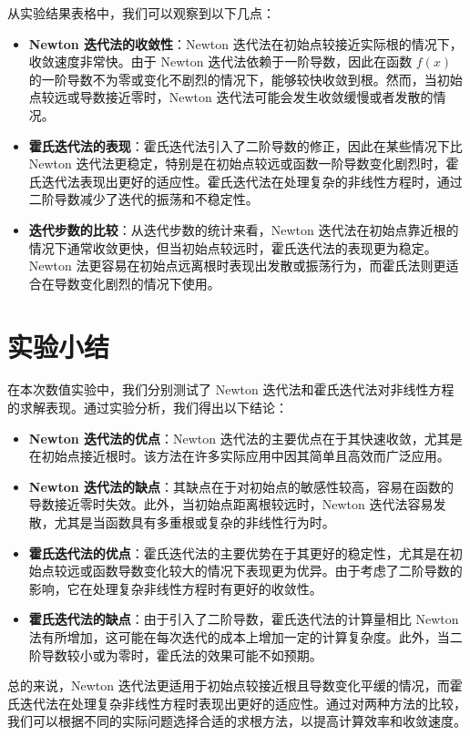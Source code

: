 \documentclass[UTF8]{ctexart}
\begin{document}
从实验结果表格中，我们可以观察到以下几点：

\begin{itemize}
    \item \textbf{Newton 迭代法的收敛性}：Newton 迭代法在初始点较接近实际根的情况下，收敛速度非常快。由于 Newton 迭代法依赖于一阶导数，因此在函数 $f(x)$ 的一阶导数不为零或变化不剧烈的情况下，能够较快收敛到根。然而，当初始点较远或导数接近零时，Newton 迭代法可能会发生收敛缓慢或者发散的情况。
    \item \textbf{霍氏迭代法的表现}：霍氏迭代法引入了二阶导数的修正，因此在某些情况下比 Newton 迭代法更稳定，特别是在初始点较远或函数一阶导数变化剧烈时，霍氏迭代法表现出更好的适应性。霍氏迭代法在处理复杂的非线性方程时，通过二阶导数减少了迭代的振荡和不稳定性。
    \item \textbf{迭代步数的比较}：从迭代步数的统计来看，Newton 迭代法在初始点靠近根的情况下通常收敛更快，但当初始点较远时，霍氏迭代法的表现更为稳定。Newton 法更容易在初始点远离根时表现出发散或振荡行为，而霍氏法则更适合在导数变化剧烈的情况下使用。
\end{itemize}

\section{实验小结}

在本次数值实验中，我们分别测试了 Newton 迭代法和霍氏迭代法对非线性方程的求解表现。通过实验分析，我们得出以下结论：

\begin{itemize}
    \item \textbf{Newton 迭代法的优点}：Newton 迭代法的主要优点在于其快速收敛，尤其是在初始点接近根时。该方法在许多实际应用中因其简单且高效而广泛应用。
    \item \textbf{Newton 迭代法的缺点}：其缺点在于对初始点的敏感性较高，容易在函数的导数接近零时失效。此外，当初始点距离根较远时，Newton 迭代法容易发散，尤其是当函数具有多重根或复杂的非线性行为时。
    \item \textbf{霍氏迭代法的优点}：霍氏迭代法的主要优势在于其更好的稳定性，尤其是在初始点较远或函数导数变化较大的情况下表现更为优异。由于考虑了二阶导数的影响，它在处理复杂非线性方程时有更好的收敛性。
    \item \textbf{霍氏迭代法的缺点}：由于引入了二阶导数，霍氏迭代法的计算量相比 Newton 法有所增加，这可能在每次迭代的成本上增加一定的计算复杂度。此外，当二阶导数较小或为零时，霍氏法的效果可能不如预期。
\end{itemize}

总的来说，Newton 迭代法更适用于初始点较接近根且导数变化平缓的情况，而霍氏迭代法在处理复杂非线性方程时表现出更好的适应性。通过对两种方法的比较，我们可以根据不同的实际问题选择合适的求根方法，以提高计算效率和收敛速度。
\end{document}
